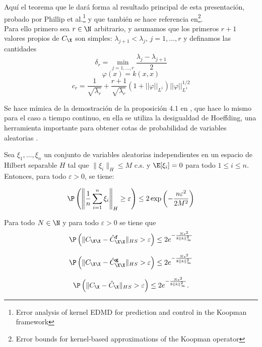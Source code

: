 Aquí el teorema que le dará forma al resultado principal de esta presentación, probado por Phillip et al.\footnote{Error analysis of kernel EDMD for prediction and control in the Koopman framework} y que también se hace referencia en\footnote{Error bounds for kernel-based approximations of the Koopman operator}.\\ 
Para ello primero sea $r \in \N$ arbitrario, y asumamos que los primeros $r + 1$ valores propios de $C_\X$ son simples: $\lambda_{j+1} < \lambda_j, \,  j = 1, \dots, r$ y definamos las cantidades
\begin{equation*}
        \delta_r = \min_{j = 1, \dots, r} \frac{\lambda_{j} - \lambda_{j+1}}{2}
\end{equation*}
\begin{equation*}
    \varphi(x) = k(x,x)
\end{equation*}
\begin{equation*}
        c_r = \frac{1}{\sqrt{\lambda_{r}}} + \frac{r + 1}{\sqrt{\lambda_r}} (1 + || \varphi ||_{L^1}) || \varphi ||_{L^1}^{1/2}
\end{equation*}

Se hace mímica de la demostración de la proposición 4.1 en \cite{Philipp2024}, que hace lo mismo para el caso a tiempo continuo, en ella se utiliza la desigualdad de Hoeffding, una herramienta importante para obtener cotas de probabilidad de variables aleatorias \cite{Pinelis1994} \cite{Mollenhauer2021}.

\begin{lema}
	Sea \(\xi_1, \dots, \xi_n\) un conjunto de variables aleatorias independientes en un espacio de Hilbert separable \(H\) tal que \( \|\xi_i\|_H \leq M \) c.s. y \(\E[\xi_i] = 0\) para todo \(1 \leq i \leq n\). Entonces, para todo \(\varepsilon > 0\), se tiene:
	
	\[
	\P\left( \left\| \frac{1}{n} \sum_{i=1}^{n} \xi_i \right\|_H \geq \varepsilon \right) \leq 2 \exp\left( -\frac{n \varepsilon^2}{2M^2} \right)
	\]
	\label{hoeffding}
\end{lema}

\begin{teo} Para todo $N \in \N$ y para todo $\varepsilon > 0$ se tiene que 
	\[
	\P\left( \|C_{\X \X} - \hat{C}_{\X \X}^{\mathbf{f}}\|_{HS} > \varepsilon \right) \leq 2e^{-\frac{N\epsilon^2}{8\|k\|_\infty^2}}
	\]
	
	\[
	\P\left( \|C_{\X \X} - \hat{C}_{\X \X}^{\mathbf{g}}\|_{HS} > \varepsilon \right) \leq 2e^{-\frac{N\epsilon^2}{8\|k\|_\infty^2}}
	\]
	
	\[
	\P\left( \|C_\X - \hat{C}_\X\|_{HS} > \varepsilon \right) \leq 2e^{-\frac{N\epsilon^2}{8\|k\|_\infty^2}}.
	\]
\end{teo}

